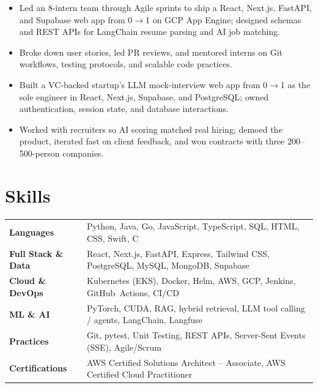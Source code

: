 \documentclass[11pt, letterpaper]{article}
\begin{document}
\vspace{1pt}
\begin{itemize}
  \item Led an 8-intern team through Agile sprints to ship a React, Next.js, FastAPI, and Supabase web app from 0$\to$1 on GCP App Engine; designed schemas and REST APIs for LangChain resume parsing and AI job matching.
  \item Broke down user stories, led PR reviews, and mentored interns on Git workflows, testing protocols, and scalable code practices.
\end{itemize}

\vspace{1pt}
\begin{itemize}
  \item Built a VC-backed startup's LLM mock-interview web app from 0$\to$1 as the sole engineer in React, Next.js, Supabase, and PostgreSQL; owned authentication, session state, and database interactions.
  \item Worked with recruiters so AI scoring matched real hiring; demoed the product, iterated fast on client feedback, and won contracts with three 200--500-person companies.
\end{itemize}

\section{Skills}
\begin{tabularx}{\textwidth}{@{}l @{\hspace{7pt}} >{\raggedright\arraybackslash}X@{}}
  \textbf{Languages} & Python, Java, Go, JavaScript, TypeScript, SQL, HTML, CSS, Swift, C \\[1pt]
  \textbf{Full Stack \& Data} & React, Next.js, FastAPI, Express, Tailwind CSS, PostgreSQL, MySQL, MongoDB, Supabase \\[1pt]
  \textbf{Cloud \& DevOps} & Kubernetes (EKS), Docker, Helm, AWS, GCP, Jenkins, GitHub~Actions, CI/CD \\[1pt]
  \textbf{ML \& AI} & PyTorch, CUDA, RAG, hybrid retrieval, LLM tool calling / agents, LangChain, Langfuse \\[1pt]
  \textbf{Practices} & Git, pytest, Unit Testing, REST APIs, Server-Sent Events (SSE), Agile/Scrum \\[1pt]
  \textbf{Certifications} & AWS Certified Solutions Architect -- Associate, AWS Certified Cloud Practitioner \\
\end{tabularx}
\end{document}
